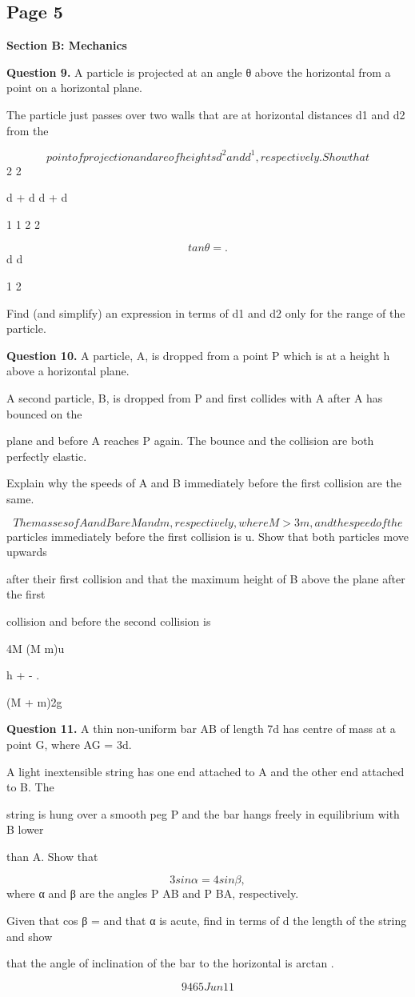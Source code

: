 \documentclass[12pt]{article}
\begin{document}
\subsection*{Page 5}
\begin{flushleft}
\bigskip\textbf{Section B: Mechanics}\par
\bigskip\textbf{Question 9.} A particle is projected at an angle θ above the horizontal from a point on a horizontal plane.\par
The particle just passes over two walls that are at horizontal distances d1 and d2 from the\par
\[point of projection and are of heights d^2 and d^1, respectively. Show that\]
2 2\par
d + d d + d\par
1 1 2 2\par
\[tan θ = .\]
d d\par
1 2\par
Find (and simplify) an expression in terms of d1 and d2 only for the range of the particle.\par
\bigskip\textbf{Question 10.} A particle, A, is dropped from a point P which is at a height h above a horizontal plane.\par
A second particle, B, is dropped from P and first collides with A after A has bounced on the\par
plane and before A reaches P again. The bounce and the collision are both perfectly elastic.\par
Explain why the speeds of A and B immediately before the first collision are the same.\par
\[The masses of A and B are M and m, respectively, where M > 3m, and the speed of the\]
particles immediately before the first collision is u. Show that both particles move upwards\par
after their first collision and that the maximum height of B above the plane after the first\par
collision and before the second collision is\par
4M (M m)u\par
h + - .\par
(M + m)2g\par
\bigskip\textbf{Question 11.} A thin non-uniform bar AB of length 7d has centre of mass at a point G, where AG = 3d.\par
A light inextensible string has one end attached to A and the other end attached to B. The\par
string is hung over a smooth peg P and the bar hangs freely in equilibrium with B lower\par
than A. Show that\par
\[3 sin α = 4 sin β ,\]
where α and β are the angles P AB and P BA, respectively.\par
Given that cos β = and that α is acute, find in terms of d the length of the string and show\par
that the angle of inclination of the bar to the horizontal is arctan .\par
\[9465 Jun11\]
\end{flushleft}
\end{document}
